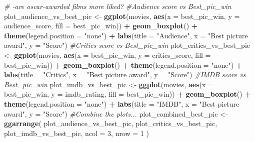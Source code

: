 \documentclass[]{article}
\newenvironment{Shaded}{\begin{snugshade}}{\end{snugshade}}
\newcommand{\CommentTok}[1]{\textcolor[rgb]{0.56,0.35,0.01}{\textit{#1}}}
\newcommand{\DataTypeTok}[1]{\textcolor[rgb]{0.13,0.29,0.53}{#1}}
\newcommand{\DecValTok}[1]{\textcolor[rgb]{0.00,0.00,0.81}{#1}}
\newcommand{\KeywordTok}[1]{\textcolor[rgb]{0.13,0.29,0.53}{\textbf{#1}}}
\newcommand{\NormalTok}[1]{#1}
\newcommand{\OperatorTok}[1]{\textcolor[rgb]{0.81,0.36,0.00}{\textbf{#1}}}
\newcommand{\StringTok}[1]{\textcolor[rgb]{0.31,0.60,0.02}{#1}}
\begin{document}
\begin{Shaded}
\begin{Highlighting}[]
\CommentTok{# -are oscar-awarded films more liked?}
\CommentTok{#Audience score vs Best_pic_win}
\NormalTok{plot_audience_vs_best_pic <-}
\StringTok{  }\KeywordTok{ggplot}\NormalTok{(movies,}
         \KeywordTok{aes}\NormalTok{(}\DataTypeTok{x =}\NormalTok{ best_pic_win, }\DataTypeTok{y =}\NormalTok{ audience_score, }\DataTypeTok{fill =}\NormalTok{ best_pic_win)) }\OperatorTok{+}\StringTok{ }\KeywordTok{geom_boxplot}\NormalTok{() }\OperatorTok{+}\StringTok{ }\KeywordTok{theme}\NormalTok{(}\DataTypeTok{legend.position =} \StringTok{"none"}\NormalTok{) }\OperatorTok{+}\StringTok{ }\KeywordTok{labs}\NormalTok{(}\DataTypeTok{title =} \StringTok{"Audience"}\NormalTok{, }\DataTypeTok{x =} \StringTok{"Best picture award"}\NormalTok{, }\DataTypeTok{y =} \StringTok{"Score"}\NormalTok{)}
\CommentTok{#Critics score vs Best_pic_win}
\NormalTok{plot_critics_vs_best_pic <-}
\StringTok{  }\KeywordTok{ggplot}\NormalTok{(movies,}
         \KeywordTok{aes}\NormalTok{(}\DataTypeTok{x =}\NormalTok{ best_pic_win, }\DataTypeTok{y =}\NormalTok{ critics_score, }\DataTypeTok{fill =}\NormalTok{ best_pic_win)) }\OperatorTok{+}\StringTok{ }\KeywordTok{geom_boxplot}\NormalTok{() }\OperatorTok{+}\StringTok{ }\KeywordTok{theme}\NormalTok{(}\DataTypeTok{legend.position =} \StringTok{"none"}\NormalTok{) }\OperatorTok{+}\StringTok{ }\KeywordTok{labs}\NormalTok{(}\DataTypeTok{title =} \StringTok{"Critics"}\NormalTok{, }\DataTypeTok{x =} \StringTok{"Best picture award"}\NormalTok{, }\DataTypeTok{y =} \StringTok{"Score"}\NormalTok{)}
\CommentTok{#IMDB score vs Best_pic_win}
\NormalTok{plot_imdb_vs_best_pic <-}
\StringTok{  }\KeywordTok{ggplot}\NormalTok{(movies, }\KeywordTok{aes}\NormalTok{(}\DataTypeTok{x =}\NormalTok{ best_pic_win, }\DataTypeTok{y =}\NormalTok{ imdb_rating, }\DataTypeTok{fill =}\NormalTok{ best_pic_win)) }\OperatorTok{+}
\StringTok{  }\KeywordTok{geom_boxplot}\NormalTok{() }\OperatorTok{+}\StringTok{ }\KeywordTok{theme}\NormalTok{(}\DataTypeTok{legend.position =} \StringTok{"none"}\NormalTok{) }\OperatorTok{+}\StringTok{ }\KeywordTok{labs}\NormalTok{(}\DataTypeTok{title =} \StringTok{"IMDB"}\NormalTok{, }\DataTypeTok{x =} \StringTok{"Best picture award"}\NormalTok{, }\DataTypeTok{y =} \StringTok{"Score"}\NormalTok{)}
\CommentTok{#Combine the plots...}
\NormalTok{plot_combined_best_pic <-}
\StringTok{  }\KeywordTok{ggarrange}\NormalTok{(}
\NormalTok{    plot_audience_vs_best_pic,}
\NormalTok{    plot_critics_vs_best_pic,}
\NormalTok{    plot_imdb_vs_best_pic,}
    \DataTypeTok{ncol =} \DecValTok{3}\NormalTok{,}
    \DataTypeTok{nrow =} \DecValTok{1}
\NormalTok{  )}


\end{Highlighting}
\end{Shaded}
\end{document}
